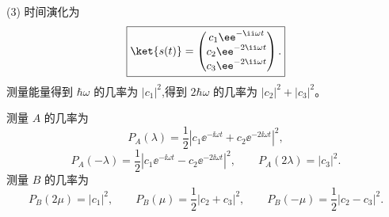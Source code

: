\begin{solution}
(3) 时间演化为
\[
\boxed{\ket{s(t)}=\begin{pmatrix}
c_1\ee^{-\ii\omega t}\\
c_2\ee^{-2\ii\omega t}\\
c_3\ee^{-2\ii\omega t}
\end{pmatrix}.}
\]
测量能量得到 $\hbar\omega$ 的几率为 $|c_1|^2$,得到 $2\hbar\omega$ 的几率为 $|c_2|^2+|c_3|^2$。

测量 $A$ 的几率为
\[
P_A(\lambda)=\frac12\left|c_1\ee^{-\ii\omega t}+c_2\ee^{-2\ii\omega t}\right|^2,
\]
\[
P_A(-\lambda)=\frac12\left|c_1\ee^{-\ii\omega t}-c_2\ee^{-2\ii\omega t}\right|^2,
\qquad
P_A(2\lambda)=|c_3|^2.
\]
测量 $B$ 的几率为
\[
P_B(2\mu)=|c_1|^2,
\qquad
P_B(\mu)=\frac12|c_2+c_3|^2,
\qquad
P_B(-\mu)=\frac12|c_2-c_3|^2.
\]
\end{solution}

